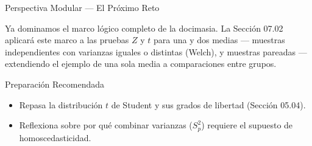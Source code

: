 \documentclass[10pt, aspectratio=169]{beamer}
\begin{document}
\begin{frame}{Perspectiva Modular --- El Próximo Reto}
  \scriptsize
  \begin{retoclase}
    Ya dominamos el marco lógico completo de la docimasia. La Sección 07.02 aplicará este marco a las pruebas $Z$ y $t$ para una y dos medias --- muestras independientes con varianzas iguales o distintas (Welch), y muestras pareadas --- extendiendo el ejemplo de una sola media a comparaciones entre grupos.
  \end{retoclase}

  \vspace{0.08cm}
  \pause
  \begin{alertblock}{Preparación Recomendada}
    \begin{itemize}\itemsep=0.06cm
      \item Repasa la distribución $t$ de Student y sus grados de libertad (Sección 05.04).
      \item Reflexiona sobre por qué combinar varianzas ($S_p^2$) requiere el supuesto de homoscedasticidad.
    \end{itemize}
  \end{alertblock}
\end{frame}
\end{document}
